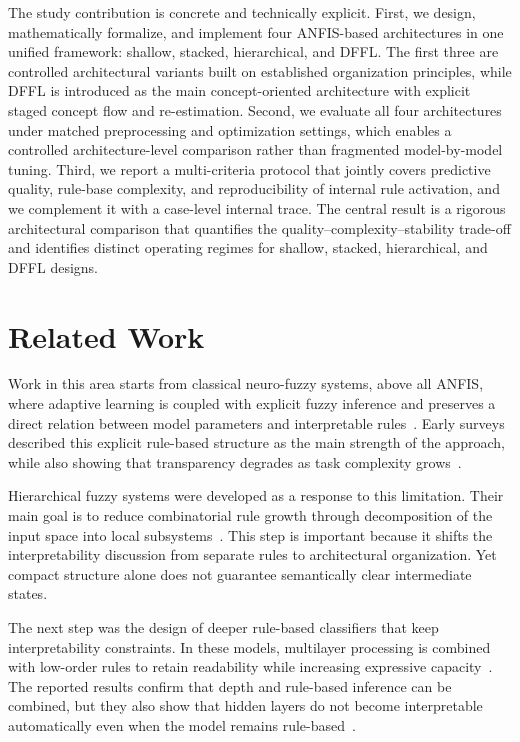 \documentclass[runningheads]{llncs}
\begin{document}
The study contribution is concrete and technically explicit. First, we design, mathematically formalize, and implement four ANFIS-based architectures in one unified framework: shallow, stacked, hierarchical, and DFFL. The first three are controlled architectural variants built on established organization principles, while DFFL is introduced as the main concept-oriented architecture with explicit staged concept flow and re-estimation. Second, we evaluate all four architectures under matched preprocessing and optimization settings, which enables a controlled architecture-level comparison rather than fragmented model-by-model tuning. Third, we report a multi-criteria protocol that jointly covers predictive quality, rule-base complexity, and reproducibility of internal rule activation, and we complement it with a case-level internal trace.
The central result is a rigorous architectural comparison that quantifies the quality--complexity--stability trade-off and identifies distinct operating regimes for shallow, stacked, hierarchical, and DFFL designs.

\section{Related Work}

Work in this area starts from classical neuro-fuzzy systems, above all ANFIS, where adaptive learning is coupled with explicit fuzzy inference and preserves a direct relation between model parameters and interpretable rules~\cite{jang1993anfis}. Early surveys described this explicit rule-based structure as the main strength of the approach, while also showing that transparency degrades as task complexity grows~\cite{mitra2000neurofuzzy}.

Hierarchical fuzzy systems were developed as a response to this limitation. Their main goal is to reduce combinatorial rule growth through decomposition of the input space into local subsystems~\cite{magdalena2019semantic,razak2022hierarchical}. This step is important because it shifts the interpretability discussion from separate rules to architectural organization. Yet compact structure alone does not guarantee semantically clear intermediate states.

The next step was the design of deeper rule-based classifiers that keep interpretability constraints. In these models, multilayer processing is combined with low-order rules to retain readability while increasing expressive capacity~\cite{zeng2019deep,feng2020highly}. The reported results confirm that depth and rule-based inference can be combined, but they also show that hidden layers do not become interpretable automatically even when the model remains rule-based~\cite{feng2020highly}.
\end{document}
